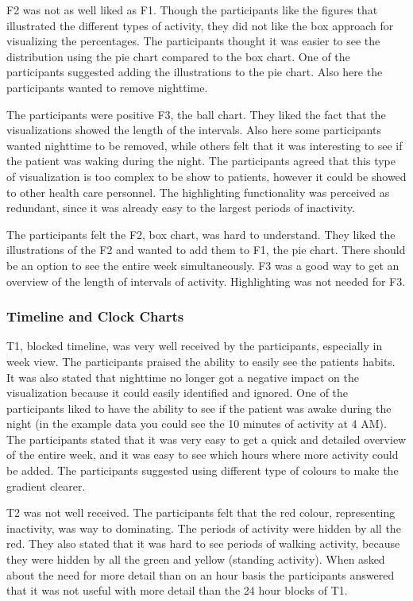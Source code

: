 F2 was not as well liked as F1. Though the participants like the figures that illustrated the different types of activity, they did not like the box approach for visualizing the percentages. The participants thought it was easier to see the distribution using the pie chart compared to the box chart. One of the participants suggested adding the illustrations to the pie chart. Also here the participants wanted to remove nighttime.

The participants were positive F3, the ball chart. They liked the fact that the visualizations showed the length of the intervals. Also here some participants wanted nighttime to be removed, while others felt that it was interesting to see if the patient was waking during the night. The participants agreed that this type of visualization is too complex to be show to patients, however it could be showed to other health care personnel. The highlighting functionality was perceived as redundant, since it was already easy to the largest periods of inactivity.

The participants felt the F2, box chart, was hard to understand. They liked the illustrations of the F2 and wanted to add them to F1, the pie chart. There should be an option to see the entire week simultaneously. F3 was a good way to get an overview of the length of intervals of activity. Highlighting was not needed for F3.

\subsubsection{Timeline and Clock Charts}
T1, blocked timeline, was very well received by the participants, especially in week view. The participants praised the ability to easily see the patients habits. It was also stated that nighttime no longer got a negative impact on the visualization because it could easily identified and ignored. One of the participants liked to have the ability to see if the patient was awake during the night (in the example data you could see the 10 minutes of activity at 4 AM). The participants stated that it was very easy to get a quick and detailed overview of the entire week, and it was easy to see which hours where more activity could be added. The participants suggested using different type of colours to make the gradient clearer.

T2 was not well received. The participants felt that the red colour, representing inactivity, was way to dominating. The periods of activity were hidden by all the red. They also stated that it was hard to see periods of walking activity, because they were hidden by all the green and yellow (standing activity). When asked about the need for more detail than on an hour basis the participants answered that it was not useful with more detail than the 24 hour blocks of T1.

